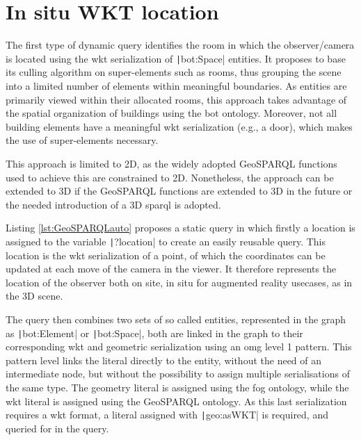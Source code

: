 \section{In situ WKT location}
The first type of dynamic query identifies the room in which the observer/camera is located using the \ac{wkt} serialization of \texttt|bot:Space| entities. It proposes to base its culling algorithm on super-elements such as rooms, thus grouping the scene into a limited number of elements within meaningful boundaries. As entities are primarily viewed within their allocated rooms, this approach takes advantage of the spatial organization of buildings using the \ac{bot} ontology. Moreover, not all building elements have a meaningful \ac{wkt} serialization (e.g., a door), which makes the use of super-elements necessary.

This approach is limited to 2D, as the widely adopted GeoSPARQL functions used to achieve this are constrained to 2D. Nonetheless, the approach can be extended to 3D if the GeoSPARQL functions are extended to 3D in the future or the needed introduction of a 3D \ac{sparql} is adopted.

Listing \ref{lst:GeoSPARQLauto} proposes a static query in which firstly a location is assigned to the variable \texttt|?location| to create an easily reusable query. This location is the \ac{wkt} serialization of a point, of which the coordinates can be updated at each move of the camera in the viewer. It therefore represents the location of the observer both on site, in situ for augmented reality usecases, as in the 3D scene. 

The query then combines two sets of so called entities, represented in the graph as \texttt|bot:Element| or \texttt|bot:Space|, both are linked in the graph to their corresponding \ac{wkt} and geometric serialization using an \ac{omg} level 1 pattern. This pattern level links the literal directly to the entity, without the need of an intermediate node, but without the possibility to assign multiple serialisations of the same type. The geometry literal is assigned using the \ac{fog} ontology, while the \ac{wkt} literal is assigned using the GeoSPARQL ontology. As this last serialization requires a \ac{wkt} format, a literal assigned with \texttt|geo:asWKT| is required, and queried for in the query. 

